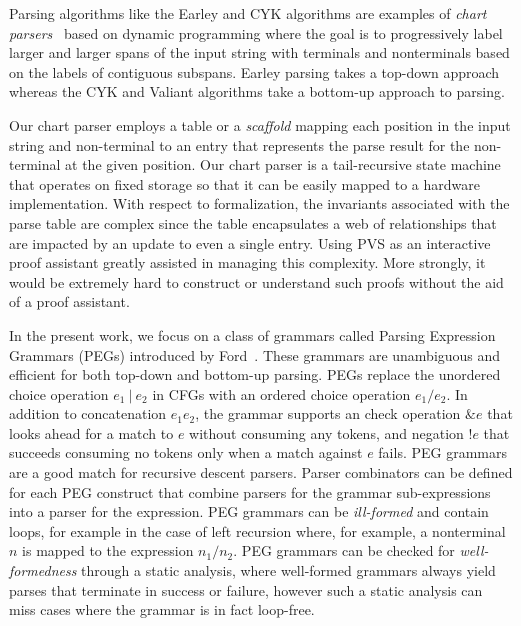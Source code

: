\documentclass[sigplan,10pt,anonymous,review]{acmart}\settopmatter{printfolios=true,printccs=false,printacmref=false}
\begin{document}
\begin{CCSXML}
Parsing algorithms like the Earley and CYK algorithms are examples of \emph{chart
parsers}~\cite{earley1970efficient,kay1986algorithm,pereira1983parsing} based on dynamic programming where the goal is to
progressively label larger and larger spans of the input string with
terminals and nonterminals based on the labels of contiguous subspans.
Earley parsing takes a top-down approach whereas the CYK and Valiant
algorithms take a bottom-up approach to parsing.

Our chart parser employs a table or a \emph{scaffold} mapping each
position in the input string and non-terminal to an entry that
represents the parse result for the non-terminal at the given
position. Our chart parser is a tail-recursive state machine that
operates on fixed storage so that it can be easily mapped to a
hardware implementation. With respect to formalization, the invariants
associated with the parse table are complex since the table
encapsulates a web of relationships that are impacted by an update to
even a single entry. Using PVS as an interactive proof assistant
greatly assisted in managing this complexity.  More strongly, it 
would be extremely hard to construct or understand such proofs
without the aid of a proof assistant. 


In the present work, we focus on a class of grammars called Parsing
Expression Grammars (PEGs) introduced by Ford~\cite{DBLP:conf/popl/Ford04}.  These grammars are
unambiguous and efficient for both top-down and bottom-up parsing.
PEGs replace the unordered choice operation $e_1 ~|~ e_2$ in CFGs with
an ordered choice operation $e_1/e_2$\@.  In addition to concatenation
$e_1 e_2$, the grammar supports an check operation $\& e$ that looks
ahead for a match to $e$ without consuming any tokens, and negation
$!e$ that succeeds consuming no tokens only when a match against $e$
fails.   PEG grammars are a good match for  recursive descent
parsers.  Parser combinators can be defined for each PEG construct that
combine parsers for the grammar sub-expressions into a parser for the
expression.  PEG grammars can be \emph{ill-formed} and contain loops, for
example in the case of left recursion where, for example, a
nonterminal $n$ is mapped to the expression $n_1/n_2$\@.  PEG grammars can
be checked for \emph{well-formedness} through a static analysis, where
well-formed grammars always yield parses that terminate in success or
failure, however such a static analysis can miss cases where the grammar
is in fact loop-free.  


\end{CCSXML}
\end{document}

